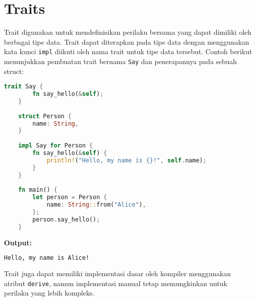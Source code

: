 \section{Traits}

Trait digunakan untuk mendefinisikan perilaku bersama yang dapat dimiliki oleh berbagai tipe data. Trait dapat diterapkan pada tipe data dengan menggunakan kata kunci \texttt{impl} diikuti oleh nama trait untuk tipe data tersebut. Contoh berikut menunjukkan pembuatan trait bernama \texttt{Say} dan penerapannya pada sebuah struct:

\begin{lstlisting}[language=Rust, caption={Contoh Trait dalam Rust}]
	trait Say {
		fn say_hello(&self);
	}
	
	struct Person {
		name: String,
	}
	
	impl Say for Person {
		fn say_hello(&self) {
			println!("Hello, my name is {}!", self.name);
		}
	}
	
	fn main() {
		let person = Person {
			name: String::from("Alice"),
		};
		person.say_hello();
	}
\end{lstlisting}

\textbf{Output:}
\begin{lstlisting}[language=bash, caption={Output Program Trait}]
	Hello, my name is Alice!
\end{lstlisting}

Trait juga dapat memiliki implementasi dasar oleh kompiler menggunakan atribut \texttt{derive}, namun implementasi manual tetap memungkinkan untuk perilaku yang lebih kompleks.

